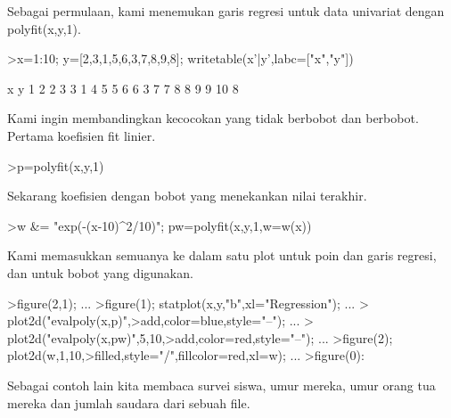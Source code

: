 \documentclass[a4paper,10pt]{article}
\begin{document}
\begin{eulernotebook}
\begin{eulercomment}
\begin{eulercomment}
\begin{eulercomment}
\begin{eulercomment}
\begin{eulercomment}
\begin{eulercomment}
\begin{eulercomment}
\begin{eulercomment}
\begin{eulercomment}
\begin{eulercomment}
\begin{eulercomment}
\begin{eulercomment}
\begin{eulercomment}
\begin{eulercomment}
\begin{eulercomment}
\begin{eulercomment}
\begin{eulercomment}
\begin{eulercomment}
\begin{eulercomment}
Sebagai permulaan, kami menemukan garis regresi untuk data univariat
dengan polyfit(x,y,1).
\end{eulercomment}
\begin{eulerprompt}
>x=1:10; y=[2,3,1,5,6,3,7,8,9,8]; writetable(x'|y',labc=["x","y"])
\end{eulerprompt}
\begin{euleroutput}
           x         y
           1         2
           2         3
           3         1
           4         5
           5         6
           6         3
           7         7
           8         8
           9         9
          10         8
\end{euleroutput}
\begin{eulercomment}
Kami ingin membandingkan kecocokan yang tidak berbobot dan berbobot.
Pertama koefisien fit linier.
\end{eulercomment}
\begin{eulerprompt}
>p=polyfit(x,y,1)
\end{eulerprompt}
\begin{euleroutput}
  [0.733333,  0.812121]
\end{euleroutput}
\begin{eulercomment}
Sekarang koefisien dengan bobot yang menekankan nilai terakhir.
\end{eulercomment}
\begin{eulerprompt}
>w &= "exp(-(x-10)^2/10)"; pw=polyfit(x,y,1,w=w(x))
\end{eulerprompt}
\begin{euleroutput}
  [4.71566,  0.38319]
\end{euleroutput}
\begin{eulercomment}
Kami memasukkan semuanya ke dalam satu plot untuk poin dan garis
regresi, dan untuk bobot yang digunakan.
\end{eulercomment}
\begin{eulerprompt}
>figure(2,1);  ...
>figure(1); statplot(x,y,"b",xl="Regression"); ...
>  plot2d("evalpoly(x,p)",>add,color=blue,style="--"); ...
>  plot2d("evalpoly(x,pw)",5,10,>add,color=red,style="--"); ...
>figure(2); plot2d(w,1,10,>filled,style="/",fillcolor=red,xl=w); ...
>figure(0):
\end{eulerprompt}
\begin{eulercomment}
Sebagai contoh lain kita membaca survei siswa, umur mereka, umur orang
tua mereka dan jumlah saudara dari sebuah file.


\end{eulercomment}
\end{eulercomment}
\end{eulercomment}
\end{eulercomment}
\end{eulercomment}
\end{eulercomment}
\end{eulercomment}
\end{eulercomment}
\end{eulercomment}
\end{eulercomment}
\end{eulercomment}
\end{eulercomment}
\end{eulercomment}
\end{eulercomment}
\end{eulercomment}
\end{eulercomment}
\end{eulercomment}
\end{eulercomment}
\end{eulercomment}
\end{eulernotebook}
\end{document}
